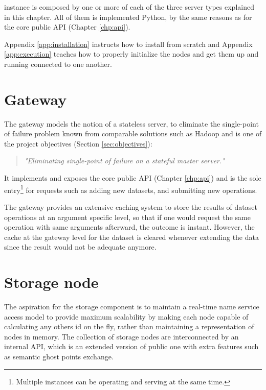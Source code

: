 \CodeName instance is composed by one or more of each of the three server types explained in this chapter. All of them is implemented Python, by the same reasons as for the core public API (Chapter \ref{chp:api}).
\newline

Appendix \ref{app:installation} instructs how to install \CodeName from scratch and Appendix \ref{app:execution} teaches how to properly initialize the nodes and get them up and running connected to one another.

\section{Gateway} \label{sec:gateway}
The \CodeName gateway models the notion of a stateless server, to eliminate the single-point of failure problem known from comparable solutions such as Hadoop and is one of the project objectives (Section \ref{sec:objectives}):
\begin{quotation}
	\textit{"Eliminating single-point of failure on a stateful master server."}
\end{quotation}

It implements and exposes the core public API (Chapter \ref{chp:api}) and is the sole entry\footnote{Multiple instances can be operating and serving at the same time.} for requests such as adding new datasets, and submitting new operations.
\newline

The gateway provides an extensive caching system to store the results of dataset operations at an argument specific level, so that if one would request the same operation with same arguments afterward, the outcome is instant. However, the cache at the gateway level for the dataset is cleared whenever extending the data since the result would not be adequate anymore.

\section{Storage node} \label{sec:storage}
The aspiration for the storage component is to maintain a real-time name service access model to provide maximum scalability by making each node capable of calculating any others id on the fly, rather than maintaining a representation of nodes in memory. The collection of storage nodes are interconnected by an internal API, which is an extended version of public one with extra features such as semantic ghost points exchange.
\newline

